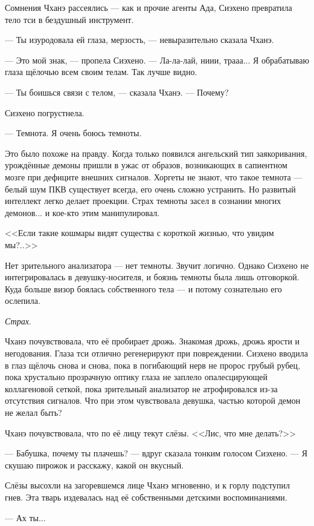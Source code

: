 Сомнения Чханэ рассеялись --- как и прочие агенты Ада, Сиэхено превратила тело тси в бездушный инструмент.

--- Ты изуродовала ей глаза, мерзость, --- невыразительно сказала Чханэ.

--- Это мой знак, --- пропела Сиэхено.
--- Ла-ла-лай, ниии, трааа...
Я обрабатываю глаза щёлочью всем своим телам.
Так лучше видно.

--- Ты боишься связи с телом, --- сказала Чханэ.
--- Почему?

Сиэхено погрустнела.

--- Темнота.
Я очень боюсь темноты.

Это было похоже на правду.
Когда только появился ангельский тип заякоривания, урождённые демоны пришли в ужас от образов, возникающих в сапиентном мозге при дефиците внешних сигналов.
Хоргеты не знают, что такое темнота --- белый шум ПКВ существует всегда, его очень сложно устранить.
Но развитый интеллект легко делает проекции.
Страх темноты засел в сознании многих демонов... и кое-кто этим манипулировал.

<<Если такие кошмары видят существа с короткой жизнью, что увидим мы?..>>

Нет зрительного анализатора --- нет темноты.
Звучит логично.
Однако Сиэхено не интегрировалась в девушку-носителя, и боязнь темноты была лишь отговоркой.
Куда больше визор боялась собственного тела --- и потому сознательно его ослепила.

\emph{Страх}.

Чханэ почувствовала, что её пробирает дрожь.
Знакомая дрожь, дрожь ярости и негодования.
Глаза тси отлично регенерируют при повреждении.
Сиэхено вводила в глаз щёлочь снова и снова, пока в погибающий нерв не пророс грубый рубец, пока хрустально прозрачную оптику глаза не заплело опалесцирующей коллагеновой сеткой, пока зрительный анализатор не атрофировался из-за отсутствия сигналов.
Что при этом чувствовала девушка, частью которой демон не желал быть?

\textspace

Чханэ почувствовала, что по её лицу текут слёзы.
<<Лис, что мне делать?>>

--- Бабушка, почему ты плачешь? --- вдруг сказала тонким голосом Сиэхено.
--- Я скушаю пирожок и расскажу, какой он вкусный.

Слёзы высохли на загоревшемся лице Чханэ мгновенно, и к горлу подступил гнев.
Эта тварь издевалась над её собственными детскими воспоминаниями.

--- Ах ты...

